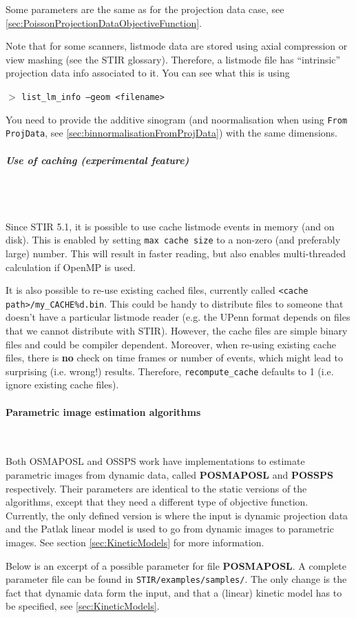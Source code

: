 \documentclass{article}
\newcommand{\subsubsubsection}[1]{\paragraph{#1}\mbox{} \\}
\newcommand{\subsubsubsubsection}[1]{\subparagraph{#1} \mbox{} \\}
\newcommand{\cmdline}[1]{\par \noindent $>$ \texttt{#1}\par}
\begin{document}
Some parameters are the same as for the projection data case, see \ref{sec:PoissonProjectionDataObjectiveFunction}.

Note that for some scanners, listmode data are stored using axial compression or view mashing
(see the STIR glossary). Therefore, a listmode file has ``intrinsic'' projection data
info associated to it.
You can see what this is using
\cmdline{list\_lm\_info --geom <filename>}
You need to provide the additive sinogram (and noormalisation when using \texttt{From ProjData}, see \ref{sec:binnormalisationFromProjData}) with the same dimensions.

{ \subsubsubsubsection{Use of caching (experimental feature)}
}\\
Since STIR 5.1, it is possible to use cache listmode events in memory (and on disk). This is enabled by setting
\texttt{max cache size} to a non-zero (and preferably large) number. This will result in faster reading, but also
enables multi-threaded calculation if OpenMP is used.

It is also possible to re-use existing cached files, currently called \texttt{<cache path>/my\_CACHE\%d.bin}.
This could be handy to distribute files to someone that doesn't have a particular listmode reader (e.g.
the UPenn format depends on files that we cannot distribute with STIR). However, the cache files are simple
binary files and could be compiler dependent. Moreover, when re-using existing cache files, there is \textbf{no}
check on time frames or number of events, which might lead to surprising (i.e. wrong!) results. Therefore,
\texttt{recompute\_cache} defaults to 1 (i.e. ignore existing cache files).


{ \subsubsubsection{Parametric image estimation algorithms}
}
\label{sec:ParametricImageIterativeAlgorithms}
Both OSMAPOSL and OSSPS work have implementations to estimate parametric images from
dynamic data, called \textbf{POSMAPOSL} and \textbf{POSSPS} respectively. 
Their parameters are identical to the static versions of the algorithms, except that
they need a different type of objective function. Currently, the only defined version is
where the input is dynamic projection data and the Patlak linear model is used to go from
dynamic images to parametric images. See section \ref{sec:KineticModels} for more information.

Below is an excerpt of a possible parameter for file \textbf{POSMAPOSL}. A complete parameter file
can be found in \texttt{STIR/examples/samples/}. The only change is the fact that dynamic data
form the input, and that a (linear) kinetic model has to be specified, see \ref{sec:KineticModels}.
\end{document}
